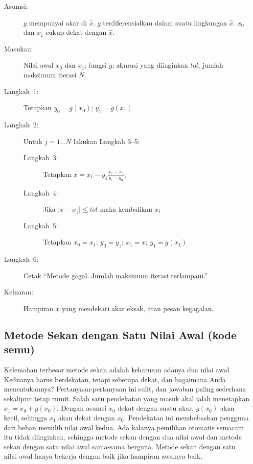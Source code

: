 \begin{pseudocode} 
\begin{description}
\item [{Asumsi:}] $g$ mempunyai akar di $\hat{x}$. $g$ terdiferensialkan
dalam suatu lingkungan $\hat{x}$. $x_{0}$ dan $x_{1}$ cukup dekat
dengan $\hat{x}$.
\item [{Masukan:}] Nilai awal $x_{0}$ dan $x_{1}$; fungsi $g$; akurasi
yang diinginkan $tol$; jumlah maksimum iterasi $N$.
\item [{Langkah~1:}] Tetapkan $y_{0}=g(x_{0})$; $y_{1}=g(x_{1})$
\item [{Langkah~2:}] Untuk $j=1\ldots N$ lakukan Langkah 3--5:

\begin{description}
\item [{Langkah~3:}] Tetapkan $x=x_{1}-y_{1}\frac{x_{1}-x_{0}}{y_{1}-y_{0}}$;
\item [{Langkah~4:}] Jika $|x-x_{1}|\leq tol$ maka kembalikan $x$;
\item [{Langkah~5:}] Tetapkan $x_{0}=x_{1}$; $y_{0}=y_{1}$; $x_{1}=x$;
$y_{1}=g(x_{1})$
\end{description}
\item [{Langkah~6:}] Cetak ``Metode gagal. Jumlah maksimum iterasi terlampaui.''
\item [{Keluaran:}] Hampiran $x$ yang mendekati akar eksak, atau pesan
kegagalan.
\end{description}
\end{pseudocode}  

\subsection{Metode Sekan dengan Satu Nilai Awal (kode semu) }

Kelemahan terbesar metode sekan adalah keharusan adanya dua nilai
awal. Keduanya harus berdekatan, tetapi seberapa dekat, dan bagaimana
Anda menentukannya? Pertanyaan-pertanyaan ini sulit, dan jawaban paling
sederhana sekalipun tetap rumit. Salah satu pendekatan yang masuk
akal ialah menetapkan $x_{1}=x_{0}+g(x_{0})$. Dengan asumsi $x_{0}$
dekat dengan suatu akar, $g(x_{0})$ akan kecil, sehingga $x_{1}$
akan dekat dengan $x_{0}$. Pendekatan ini membebaskan pengguna dari
beban memilih nilai awal kedua. Ada kalanya pemilihan otomatis semacam
itu tidak diinginkan, sehingga metode sekan dengan dua nilai awal
dan metode sekan dengan satu nilai awal sama-sama berguna. Metode
sekan dengan satu nilai awal hanya bekerja dengan baik jika hampiran
awalnya baik.

